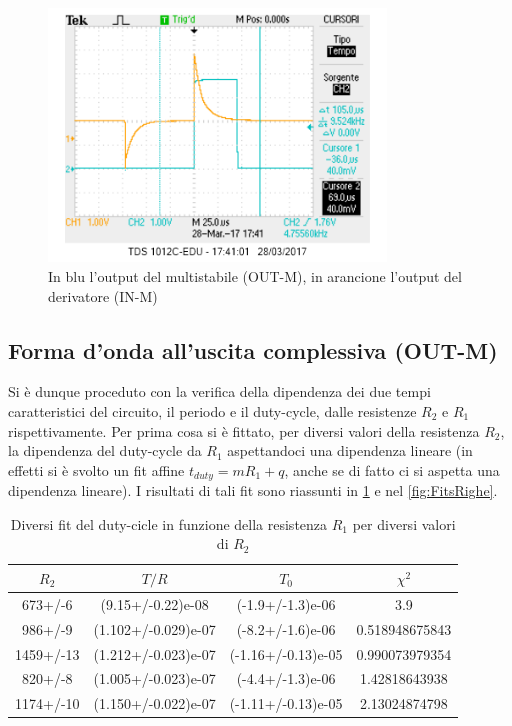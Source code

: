 \documentclass[a4paper,10pt]{article}
\begin{document}


\begin{figure}[H]
	\centering
	\includegraphics[width=0.8\textwidth]{../grafici/4InMOutM.png}
	\caption{In blu l'output del multistabile (OUT-M), in arancione l'output del derivatore (IN-M)}
	\label{fig:InMOutM}
\end{figure}

\pagebreak[1]
\subsection{Forma d'onda all'uscita complessiva (OUT-M)}

Si è dunque proceduto con la verifica della dipendenza dei due tempi caratteristici del circuito, il periodo e il duty-cycle, dalle resistenze $R_2$ e $R_1$ rispettivamente. Per prima cosa si è fittato, per diversi valori della resistenza $R_2$, la dipendenza del duty-cycle da $R_1$ aspettandoci una dipendenza lineare (in effetti si è svolto un fit affine $t_{duty}=mR_1+q$, anche se di fatto ci si aspetta una dipendenza lineare). I risultati di tali fit sono riassunti in \cref{tab:DutyFit} e nel \cref{fig:FitsRighe}. 

\begin{table}[H]
\centering
\begin{tabular}{c|c|c|c} 
$R_2$ & $T/R$ & $T_0$ & $\chi^2$\\
\hline
673+/-6 & (9.15+/-0.22)e-08 & (-1.9+/-1.3)e-06 & 3.9\\
986+/-9 & (1.102+/-0.029)e-07 & (-8.2+/-1.6)e-06 & 0.518948675843\\
1459+/-13 & (1.212+/-0.023)e-07 & (-1.16+/-0.13)e-05 & 0.990073979354\\
820+/-8 & (1.005+/-0.023)e-07 & (-4.4+/-1.3)e-06 & 1.42818643938\\
1174+/-10 & (1.150+/-0.022)e-07 & (-1.11+/-0.13)e-05 & 2.13024874798\\
\end{tabular}
\caption{Diversi fit del duty-cicle in funzione della resistenza $R_1$ per diversi valori di $R_2$}
\label{tab:DutyFit}
\end{table}
\end{document}
